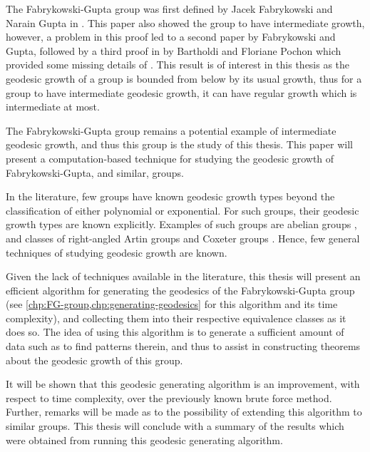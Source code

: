 The Fabrykowski-Gupta group was first defined by Jacek Fabrykowski and Narain Gupta in \cite{FabGuptaI}.
This paper also showed the group to have intermediate growth, however, a problem in this proof led to a second paper \cite{FabGuptaII} by Fabrykowski and Gupta, followed by a third proof in \cite{OnGrowth} by Bartholdi and Floriane Pochon which provided some missing details of \cite{FabGuptaII}.
This result is of interest in this thesis as the geodesic growth of a group is bounded from below by its usual growth, thus for a group to have intermediate geodesic growth, it can have regular growth which is intermediate at most.

The Fabrykowski-Gupta group remains a potential example of intermediate geodesic growth, and thus this group is the study of this thesis.
This paper will present a computation-based technique for studying the geodesic growth of Fabrykowski-Gupta, and similar, groups.

In the literature, few groups have known geodesic growth types beyond the classification of either polynomial %
or exponential.
For such groups, their geodesic growth types are known explicitly.
Examples of such groups are abelian groups \cite{Julie2016GeodesicGrowth}, and classes of right-angled Artin groups and Coxeter groups \cite{GeodesicsCoxeterI,GeodesicsCoxeterII}.
Hence, few general techniques of studying geodesic growth are known.

Given the lack of techniques available in the literature, this thesis will present an efficient algorithm for generating the geodesics of the Fabrykowski-Gupta group (see \cref{chp:FG-group,chp:generating-geodesics} for this algorithm and its time complexity), and collecting them into their respective equivalence classes as it does so.
The idea of using this algorithm is to generate a sufficient amount of data such as to find patterns therein, and thus to assist in constructing theorems about the geodesic growth of this group.

It will be shown that this geodesic generating algorithm is an improvement, with respect to time complexity, over the previously known brute force method.
Further, remarks will be made as to the possibility of extending this algorithm to similar groups.
This thesis will conclude with a summary of the results which were obtained from running this geodesic generating algorithm.
